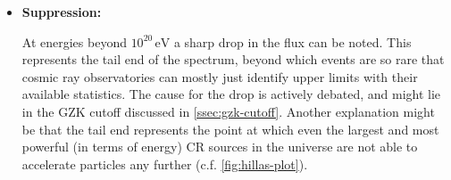\begin{itemize}
\item \textbf{Suppression:}

At energies beyond $10^{20}\,\text{eV}$ a sharp drop in the flux can be noted. This represents the tail end of the spectrum, beyond which events are so rare that 
cosmic ray observatories can mostly just identify upper limits with their available statistics. The cause for the drop is actively debated, and might lie in the 
GZK cutoff discussed in \autoref{ssec:gzk-cutoff}. Another explanation might be that the tail end represents the point at which even the largest and most powerful
(in terms of energy) CR sources in the universe are not able to accelerate particles any further (c.f. \autoref{fig:hillas-plot}). 

\end{itemize}